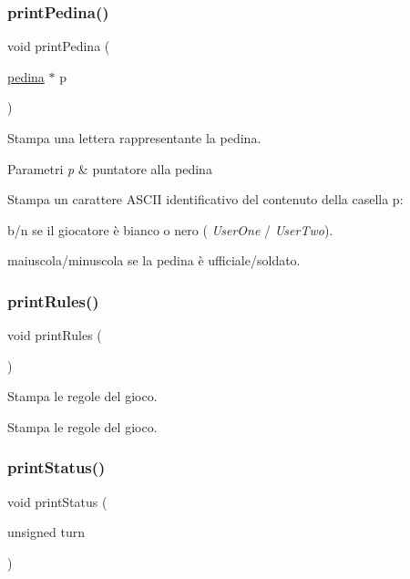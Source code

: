 \subsubsection{\texorpdfstring{print\+Pedina()}{printPedina()}}
{\footnotesize\ttfamily void print\+Pedina (\begin{DoxyParamCaption}\item[{\hyperlink{ml__lib_8h_a71fee95122b31f5cb0b07d9c16ffa3a5}{pedina} $\ast$}]{p }\end{DoxyParamCaption})}



Stampa una lettera rappresentante la pedina. 


\begin{DoxyParams}{Parametri}
{\em p} & puntatore alla pedina\\
\hline
\end{DoxyParams}
Stampa un carattere A\+S\+C\+II identificativo del contenuto della casella p\+: 
\begin{DoxyItemize}
\item b/n se il giocatore è bianco o nero ( {\itshape User\+One} / {\itshape User\+Two}). 
\item maiuscola/minuscola se la pedina è ufficiale/soldato. 
\end{DoxyItemize}\mbox{\label{group__Output_gafa3767d5c549d555cf1817fe57c614fc}} 
\subsubsection{\texorpdfstring{print\+Rules()}{printRules()}}
{\footnotesize\ttfamily void print\+Rules (\begin{DoxyParamCaption}{ }\end{DoxyParamCaption})}



Stampa le regole del gioco. 

Stampa le regole del gioco. \mbox{\label{group__Output_ga0e671ab1d1412c0843d69c03ab2cfbac}} 
\subsubsection{\texorpdfstring{print\+Status()}{printStatus()}}
{\footnotesize\ttfamily void print\+Status (\begin{DoxyParamCaption}\item[{unsigned}]{turn }\end{DoxyParamCaption})}




